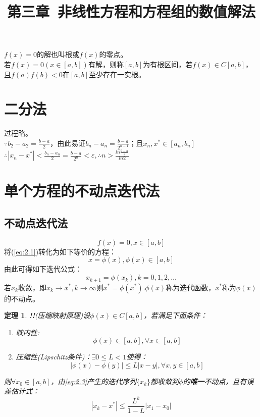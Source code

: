 \documentclass[a4paper]{article}
\title{第三章\ 非线性方程和方程组的数值解法}
\author{}
\date{}
\newtheorem{theorem}{定理}[section]
\begin{document}
\maketitle

$f(x)=0$的解也叫根或$f(x)$的零点。\\
若$f(x)=0(x\in [a,b])$有解，则称$[a,b]$为有根区间，若$f(x) \in C[a,b]$，且$f(a)f(b)<0$在$[a,b]$至少存在一实根。

\section{二分法}
过程略。\\
$\because b_2-a_2 = \frac{b-a}{2}$，由此易证$b_n-a_n=\frac{b-a}{2^{n-1}}$；且$x_n, x^* \in [a_n, b_n]$\\
$\therefore |x_n-x^*|<\frac{b_n-a_n}{2}=\frac{b-a}{2^n}<\varepsilon, \therefore n > \frac{ln\frac{b-a}{\varepsilon}}{ln2} $

\section{单个方程的不动点迭代法}
\subsection{不动点迭代法}
\begin{equation}
    f(x)=0, x\in [a,b]
    \label{eq:2.1}
\end{equation}
将(\ref{eq:2.1})转化为如下等价的方程：
\begin{equation}
    x=\phi(x), \phi(x)\in [a,b]
\end{equation}
由此可得如下迭代公式：
\begin{equation}
    x_{k+1} = \phi(x_k), k=0,1,2,\dots
    \label{eq:2.3}
\end{equation}
若$x_k$收敛，即$x_k\rightarrow x^*, k\rightarrow \infty$则$x^*=\phi(x^*)$.$\phi(x)$称为迭代函数，$x^*$称为$\phi(x)$的不动点。

\begin{theorem}
    \textbf{!!}(压缩映射原理)设$\phi(x)\in C[a,b]$，若满足下面条件：
    \begin{enumerate}
        \item 映内性:\begin{equation}
            \phi(x) \in [a,b], \forall x\in [a,b]
            \label{eq:2.4}
        \end{equation}
        \item 压缩性(Lipschitz条件)：$\exists 0\le L <1$使得：
        \begin{equation}
            |\phi(x)-\phi(y)|\le L|x-y|, \forall x,y\in [a,b]
            \label{eq:2.5}
        \end{equation}
    \end{enumerate}
    则$\forall x_0\in[a,b]$，由\ref{eq:2.3}产生的迭代序列$\{x_k\}$都收敛到$\phi$的\textbf{唯一}不动点，且有误差估计式：
    \begin{equation}
        |x_k-x^*|\le \frac{L^k}{1-L}|x_1-x_0|
        \label{eq:2.6}
    \end{equation}
    \label{theorem:2.1}
\end{theorem}
\end{document}
